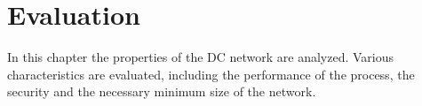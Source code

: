 


\section{Evaluation}
\label{Evaluation}
In this chapter the properties of the DC network are analyzed. Various characteristics are evaluated, including the performance of the process, the security and the necessary minimum size of the network.
